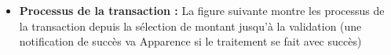\begin{itemize}[label=$\ast$]
	
	\newpage
	\item \textbf{Processus de la transaction
		:} La figure suivante montre les processus de la transaction depuis la sélection de montant jusqu'à la validation (une notification de succès va Apparence si le traitement se fait avec succès)

\end{itemize}

